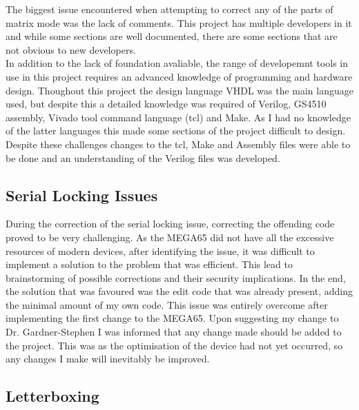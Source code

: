The biggest issue encountered when attempting to correct any of the parts of matrix mode was the lack of comments. This project has multiple developers in it and while some sections are well documented, there are some sections that are not obvious to new developers.\\
In addition to the lack of foundation avaliable, the range of developemnt tools in use in this project requires an advanced knowledge of programming and hardware design. Thoughout this project the design language VHDL was the main language used, but despite this a detailed knowledge was required of Verilog, GS4510 assembly, Vivado tool command language (tcl) and Make. As I had no knowledge of the latter languages this made some sections of the project difficult to design.\\
Despite these challenges changes to the tcl, Make and Assembly files were able to be done and an understanding of the Verilog files was developed.

\subsection{Serial Locking Issues}

\label{Ch7 Sec1 Sub2}

During the correction of the serial locking issue, correcting the offending code proved to be very challenging. As the MEGA65 did not have all the excessive resources of modern devices, after identifying the issue, it was difficult to implement a solution to the problem that was efficient. This lead to brainstorming of possible corrections and their security implications. In the end, the solution that was favoured was the edit code that was already present, adding the minimal amount of my own code. This issue was entirely overcome after implementing the first change to the MEGA65. Upon suggesting my change to Dr. Gardner-Stephen I was informed that any change made should be added to the project. This was as the optimisation of the device had not yet occurred, so any changes I make will inevitably be improved.  

\subsection{Letterboxing}

\label{Ch7 Sec1 Sub3}

